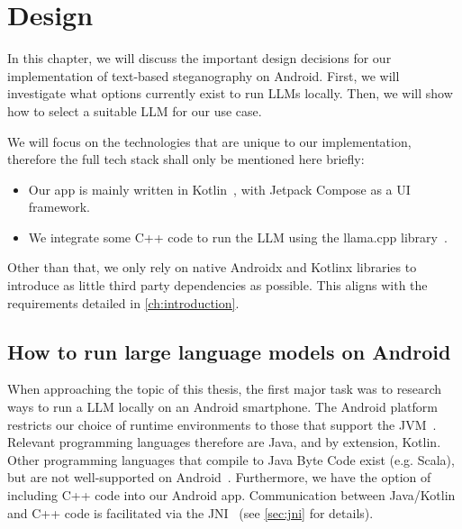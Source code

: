 
\chapter{Design}\label{ch:design}
\glsresetall %

In this chapter, we will discuss the important design decisions for our implementation of text-based steganography on Android. First, we will investigate what options currently exist to run \glspl{LLM} locally. Then, we will show how to select a suitable \gls{LLM} for our use case.

We will focus on the technologies that are unique to our implementation, therefore the full tech stack shall only be mentioned here briefly:
\begin{itemize}
	\item Our app is mainly written in Kotlin~\cite{kotlinKotlinProgrammingLanguage}, with Jetpack Compose as a \gls{UI} framework.
	\item We integrate some C++ code to run the \gls{LLM} using the llama.cpp library~\cite{gerganovGgerganovLlamacpp2024}.
\end{itemize}

Other than that, we only rely on native Androidx and Kotlinx libraries to introduce as little third party dependencies as possible. This aligns with the requirements detailed in \cref{ch:introduction}.

\section{How to run large language models on Android}
\label{sec:howToRunLLMsOnAndroid}
When approaching the topic of this thesis, the first major task was to research ways to run a \gls{LLM} locally on an Android smartphone. The Android platform restricts our choice of runtime environments to those that support the \gls{JVM}~\cite{ruggiaDarkSideNative2025}. Relevant programming languages therefore are Java, and by extension, Kotlin. Other programming languages that compile to Java Byte Code exist (e.g. Scala), but are not well-supported on Android~\cite{ruggiaDarkSideNative2025}. Furthermore, we have the option of including C++ code into our Android app. Communication between Java/Kotlin and C++ code is facilitated via the \gls{JNI}~\cite{ruggiaDarkSideNative2025} (see \cref{sec:jni} for details).

